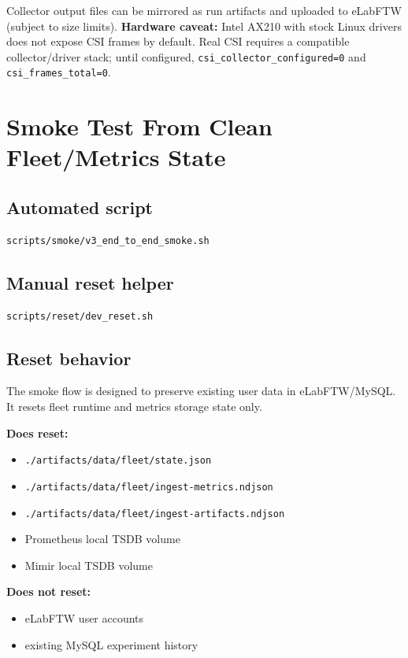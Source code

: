 \documentclass[11pt,a4paper]{article}
\begin{document}
Collector output files can be mirrored as run artifacts and uploaded to eLabFTW (subject to size limits).
\textbf{Hardware caveat:} Intel AX210 with stock Linux drivers does not expose CSI frames by default. Real CSI requires a compatible collector/driver stack; until configured, \texttt{csi\_collector\_configured=0} and \texttt{csi\_frames\_total=0}.

\section{Smoke Test From Clean Fleet/Metrics State}
\subsection{Automated script}
\begin{verbatim}
scripts/smoke/v3_end_to_end_smoke.sh
\end{verbatim}

\subsection{Manual reset helper}
\begin{verbatim}
scripts/reset/dev_reset.sh
\end{verbatim}

\subsection{Reset behavior}
The smoke flow is designed to preserve existing user data in eLabFTW/MySQL.
It resets fleet runtime and metrics storage state only.

\textbf{Does reset:}
\begin{itemize}
  \item \texttt{./artifacts/data/fleet/state.json}
  \item \texttt{./artifacts/data/fleet/ingest-metrics.ndjson}
  \item \texttt{./artifacts/data/fleet/ingest-artifacts.ndjson}
  \item Prometheus local TSDB volume
  \item Mimir local TSDB volume
\end{itemize}

\textbf{Does not reset:}
\begin{itemize}
  \item eLabFTW user accounts
  \item existing MySQL experiment history
\end{itemize}
\end{document}
